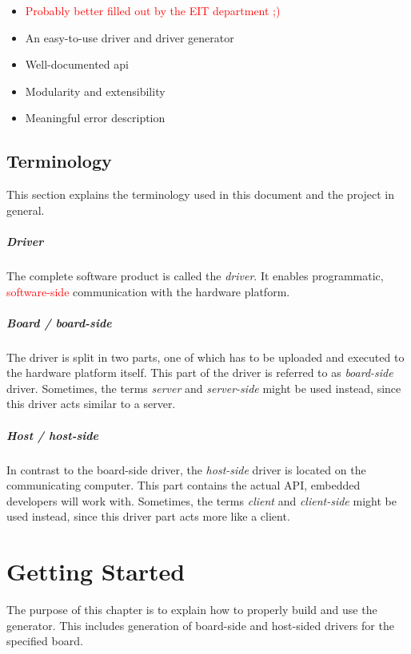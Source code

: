 \documentclass{report}
\begin{document}
\begin{itemize}
\item \textcolor{red}{Probably better filled out by the EIT department ;)}
\item An easy-to-use driver and driver generator
\item Well-documented api
\item Modularity and extensibility
\item Meaningful error description
\end{itemize}

\section{Terminology}
\label{sec:term}
This section explains the terminology used in this document and the project in general.

\paragraph{Driver}
The complete software product is called the \textit{driver}. It enables programmatic, \textcolor{red}{software-side} communication with the hardware platform.

\paragraph{Board / board-side}
The driver is split in two parts, one of which has to be uploaded and executed to the hardware platform itself. This part of the driver is referred to as \textit{board-side} driver. Sometimes, the terms \textit{server} and \textit{server-side} might be used instead, since this driver acts similar to a server.

\paragraph{Host / host-side}
In contrast to the board-side driver, the \textit{host-side} driver is located on the communicating computer. This part contains the actual API, embedded developers will work with. Sometimes, the terms \textit{client} and \textit{client-side} might be used instead, since this driver part acts more like a client.


\chapter{Getting Started}
\label{sec:start}
The purpose of this chapter is to explain how to properly build and use the generator. This includes generation of board-side and host-sided drivers for the specified board.
\end{document}
